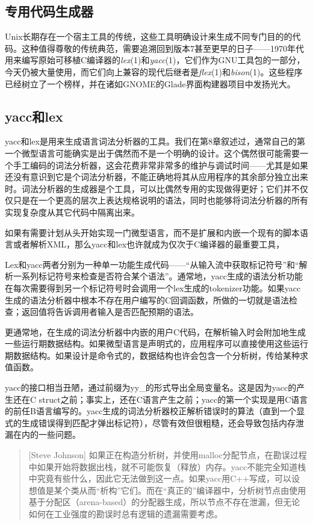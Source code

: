 \documentclass[12pt,oneside]{ctexbook}
\begin{document}
\begin{common-format}
\section{专用代码生成器}
Unix长期存在一个宿主工具的传统，这些工具明确设计来生成不同专门目的的代码。这种值得尊敬的传统典范，需要追溯回到版本7甚至更早的日子——1970年代用来编写原始可移植C编译器的\textit{lex}(1)和\textit{yacc}(1)，它们作为GNU工具包的一部分，今天仍被大量使用，而它们向上兼容的现代后继者是\textit{flex}(1)和\textit{bison}(1)。这些程序已经树立了一个榜样，并在诸如GNOME的Glade界面构建器项目中发扬光大。


\subsection{yacc和lex}
yacc和lex是用来生成语言词法分析器的工具。我们在第8章叙述过，通常自己的第一个微型语言可能确实是出于偶然而不是一个明确的设计。这个偶然很可能需要一个手工编码的词法分析器，这会花费非常非常多的维护与调试时间——尤其是如果还没有意识到它是个词法分析器，不能正确地将其从应用程序的其余部分独立出来时。词法分析器的生成器是个工具，可以比偶然专用的实现做得更好；它们并不仅仅只是在一个更高的层次上表达规格说明的语法，同时也能够将词法分析器的所有实现复杂度从其它代码中隔离出来。

如果有需要计划从头开始实现一门微型语言，而不是扩展和内嵌一个现有的脚本语言或者解析XML，那么yacc和lex也许就成为仅次于C编译器的最重要工具，

Lex和yacc两者分别为一种单一功能生成代码——“从输入流中获取标记符号”和“解析一系列标记符号来检查是否符合某个语法”。通常地，yacc生成的语法分析功能在每次需要得到另一个标记符号时会调用一个lex生成的tokenizer功能。如果yacc生成的语法分析器中根本不存在用户编写的C回调函数，所做的一切就是语法检查；返回值将告诉调用者输入是否匹配预期的语法。

更通常地，在生成的词法分析器中内嵌的用户C代码，在解析输入时会附加地生成一些运行期数据结构。如果微型语言是声明式的，应用程序可以直接使用这些运行期数据结构。如果设计是命令式的，数据结构也许会包含一个分析树，传给某种求值函数。

yacc的接口相当丑陋，通过前缀为yy\_{}的形式导出全局变量名。这是因为yacc的产生还在C struct之前；事实上，还在C语言产生之前；yacc的第一个实现是用C语言的前任B语言编写的。yacc生成的词法分析器校正解析错误时的算法（直到一个显式的生成错误得到匹配才弹出标记符），尽管有效但很粗糙，还会导致包括内存泄漏在内的一些问题。

\begin{quote}[Steve Johnson]
如果正在构造分析树，并使用malloc分配节点，在勘误过程中如果开始将数据出栈，就不可能恢复（释放）内存。yacc不能完全知道栈中究竟有些什么，因此它无法做到这一点。如果yacc用C++写成，可以设想值是某个类从而“析构”它们。而在“真正的”编译器中，分析树节点由使用基于分配区（arena-based）的分配器生成，所以节点不存在泄漏，但无论如何在工业强度的勘误时总有逻辑的遗漏需要考虑。
\end{quote}


\end{common-format}
\end{document}
